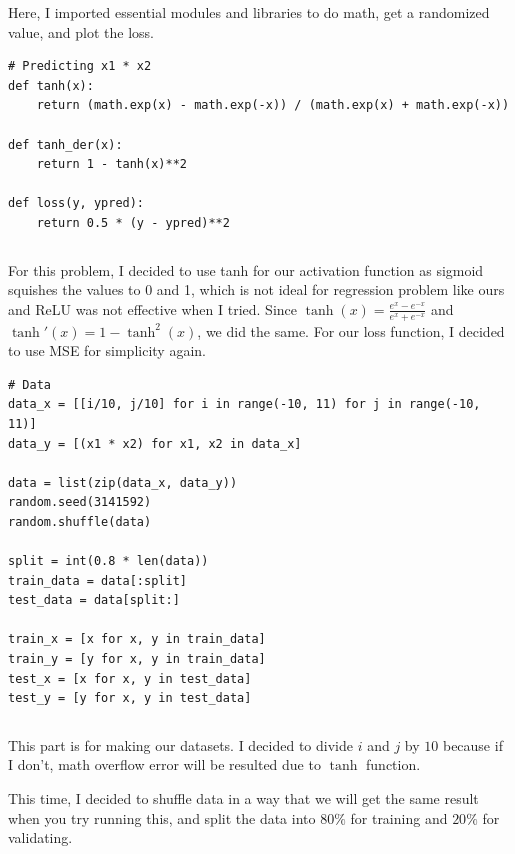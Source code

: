\documentclass[../../../main.tex]{subfiles}
\begin{document}
Here, I imported essential modules and libraries to do math, get
a randomized value, and plot the loss.

\begin{jupyter}
\begin{lstlisting}[style=jin]
# Predicting x1 * x2
def tanh(x):
    return (math.exp(x) - math.exp(-x)) / (math.exp(x) + math.exp(-x))

def tanh_der(x):
    return 1 - tanh(x)**2

def loss(y, ypred):
    return 0.5 * (y - ypred)**2
\end{lstlisting}
\begin{lstlisting}[style=jout]
\end{lstlisting}
\end{jupyter}

For this problem, I decided to use tanh for our activation function
as sigmoid squishes the values to 0 and 1, which is not ideal for
regression problem like ours and ReLU was not effective when I tried.
Since $\tanh(x) = \frac{e^x - e^{-x}}{e^x + e^{-x}}$ and $\tanh'(x) =
1 - \tanh^2(x)$, we did the same. For our loss function, I decided to
use MSE for simplicity again.

\begin{jupyter}
\begin{lstlisting}[style=jin]
# Data
data_x = [[i/10, j/10] for i in range(-10, 11) for j in range(-10, 11)]
data_y = [(x1 * x2) for x1, x2 in data_x]

data = list(zip(data_x, data_y))
random.seed(3141592)
random.shuffle(data)

split = int(0.8 * len(data))
train_data = data[:split]
test_data = data[split:]

train_x = [x for x, y in train_data]
train_y = [y for x, y in train_data]
test_x = [x for x, y in test_data]
test_y = [y for x, y in test_data]
\end{lstlisting}
\begin{lstlisting}[style=jout]
\end{lstlisting}
\end{jupyter}

This part is for making our datasets. I decided to divide $i$ and $j$
by $10$ because if I don't, math overflow error will be resulted
due to $\tanh$ function.

This time, I decided to shuffle data in a way that we will get the
same result when you try running this, and split the data into
$80\%$ for training and $20\%$ for validating.
\end{document}
